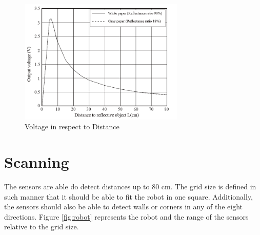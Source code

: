 \begin{figure}[htp]
	\centering
	\includegraphics[width=0.7\textwidth]{figures/scan/OutputVoltage.png}
	\caption{Voltage in respect to Distance}
	\label{fig:distance_voltage}
\end{figure}
\newpage
\section{Scanning}\label{sec:scanning}

The sensors are able do detect distances up to 80 cm. The grid size is 
defined in such manner that it should be able to fit the robot in one square. 
Additionally, the sensors should also be able to detect walls or corners in 
any of the eight directions.
Figure \ref{fig:robot} represents the robot and the range of the sensors relative
to the grid size.

